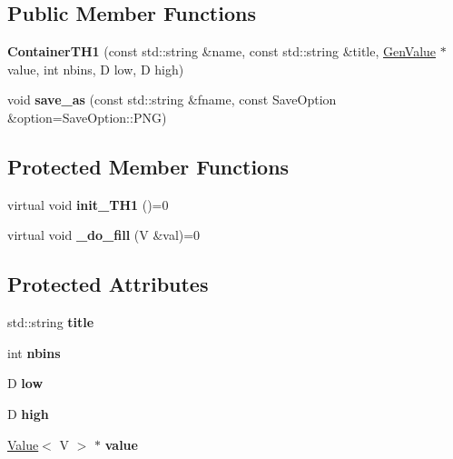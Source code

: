\subsection*{Public Member Functions}
\begin{DoxyCompactItemize}
\item 
\hypertarget{classfv_1_1root_1_1ContainerTH1_a5b2633b7ac0e398eb1fee32493af9787}{}\label{classfv_1_1root_1_1ContainerTH1_a5b2633b7ac0e398eb1fee32493af9787} 
{\bfseries Container\+T\+H1} (const std\+::string \&name, const std\+::string \&title, \hyperlink{classfv_1_1GenValue}{Gen\+Value} $\ast$value, int nbins, D low, D high)
\item 
\hypertarget{classfv_1_1root_1_1ContainerTH1_a552e1df4c424ab98206033b3ff8f6bd1}{}\label{classfv_1_1root_1_1ContainerTH1_a552e1df4c424ab98206033b3ff8f6bd1} 
void {\bfseries save\+\_\+as} (const std\+::string \&fname, const Save\+Option \&option=Save\+Option\+::\+P\+NG)
\end{DoxyCompactItemize}
\subsection*{Protected Member Functions}
\begin{DoxyCompactItemize}
\item 
\hypertarget{classfv_1_1root_1_1ContainerTH1_af9fe1115dc1e587974fa754b91656fba}{}\label{classfv_1_1root_1_1ContainerTH1_af9fe1115dc1e587974fa754b91656fba} 
virtual void {\bfseries init\+\_\+\+T\+H1} ()=0
\item 
\hypertarget{classfv_1_1root_1_1ContainerTH1_a459da5a66c6e582fe4cbe2b509247e20}{}\label{classfv_1_1root_1_1ContainerTH1_a459da5a66c6e582fe4cbe2b509247e20} 
virtual void {\bfseries \+\_\+do\+\_\+fill} (V \&val)=0
\end{DoxyCompactItemize}
\subsection*{Protected Attributes}
\begin{DoxyCompactItemize}
\item 
\hypertarget{classfv_1_1root_1_1ContainerTH1_a9778e00b2e0703499db8ff0ff07b11eb}{}\label{classfv_1_1root_1_1ContainerTH1_a9778e00b2e0703499db8ff0ff07b11eb} 
std\+::string {\bfseries title}
\item 
\hypertarget{classfv_1_1root_1_1ContainerTH1_abd1f59dcbfa3fdded4798f33eeb8449b}{}\label{classfv_1_1root_1_1ContainerTH1_abd1f59dcbfa3fdded4798f33eeb8449b} 
int {\bfseries nbins}
\item 
\hypertarget{classfv_1_1root_1_1ContainerTH1_a52ba4700aee1636a0ae9304dbecd4a29}{}\label{classfv_1_1root_1_1ContainerTH1_a52ba4700aee1636a0ae9304dbecd4a29} 
D {\bfseries low}
\item 
\hypertarget{classfv_1_1root_1_1ContainerTH1_afb62f146c619d79867275ba559c3df8e}{}\label{classfv_1_1root_1_1ContainerTH1_afb62f146c619d79867275ba559c3df8e} 
D {\bfseries high}
\item 
\hypertarget{classfv_1_1root_1_1ContainerTH1_a5d91fe71636d55f86f6e3104fc093787}{}\label{classfv_1_1root_1_1ContainerTH1_a5d91fe71636d55f86f6e3104fc093787} 
\hyperlink{classfv_1_1Value}{Value}$<$ V $>$ $\ast$ {\bfseries value}
\end{DoxyCompactItemize}
